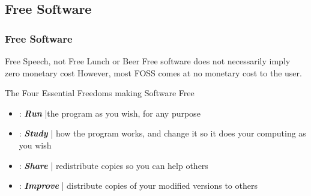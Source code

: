 \documentclass{beamer}
\begin{document}

	
	\subsection{Free Software}
\begin{frame}
	\frametitle{Free Software}
	\begin{block}{Free Speech, not Free Lunch or Beer}
		Free software does not necessarily imply zero monetary cost \newline
		However, most FOSS comes at no monetary cost to the user.
	\end{block}
	\begin{block}{The Four Essential Freedoms making Software Free}
		\begin{itemize}
			\item {\color{red}{Freedom 0}}: \textit{\textbf{Run}} |the program as you wish, for any purpose 
			\item {\color{red}{Freedom 1}}: \textbf{\textit{Study}} | how the program works, and change it so it does your computing as you wish \newline
			{}
			\item {\color{red}{Freedom 2}}: \textbf{\textit{Share }}| redistribute copies so you can help others
			\item {\color{red}{Freedom 3}}: \textbf{\textit{Improve}} | distribute copies of your modified versions to others 
		\end{itemize}
	\end{block}
\end{frame}
\end{document}
